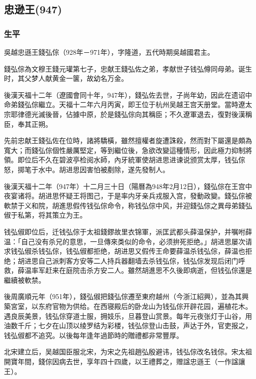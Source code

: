 
\subsection{忠逊王\tiny(947)}

\subsubsection{生平}

吳越忠遜王錢弘倧（928年－971年），字隆道，五代時期吳越國君主。

錢弘倧為文穆王錢元瓘第七子，忠献王錢弘佐之弟，孝献世子钱弘僔同母弟。诞生时，其父梦人献黄金一箧，故幼名万金。

後漢天福十二年（遼國會同十年，947年），錢弘佐去世，子尚年幼，因此在遗诏中命弟錢弘倧繼立。天福十二年六月丙寅，即王位于杭州吴越王宫天册堂。當時遼太宗耶律德光滅後晉，佔據中原，於是錢弘倧向其稱臣；不久遼軍退去，復對後漢稱臣，奉其正朔。

先前忠献王錢弘佐在位時，諸將驕橫，雖然擅權者旋遭誅殺，然而對下屬還是頗為寬大；而錢弘倧個性嚴厲堅定，等到繼位後，急欲改變這種情形，因此極力抑制將領。即位后不久在碧波亭检阅水師，內牙統軍使胡进思进谏说颁赏太厚，钱弘倧怒，掷笔于水中。胡进思因害怕被剷除，遂先發制人。

後漢天福十二年（947年）十二月三十日（陽曆為948年2月12日），錢弘倧在王宫中夜宴诸将。胡进思怀疑王将图己，于是率内牙亲兵戎服入宫，發動政變。錢弘倧被軟禁于义和院，胡進思假传钱弘倧命令，称钱弘倧中风，并迎錢弘倧之異母弟錢弘俶于私第，将其策立为王。

钱弘俶即位后，迁钱弘倧于太祖錢鏐故里衣锦軍，派匡武都头薛温保护，并嘱咐薛温：「自己没有杀兄的意思，一旦傳來类似的命令，必须拚死拒绝。」胡进思屡次请求钱弘俶杀钱弘倧，钱弘俶都拒绝，胡进思又假传王命要薛温杀钱弘倧，薛温也拒绝；胡进思自己派刺客方安等二人持兵器翻墙去杀钱弘倧，钱弘倧发现后闭门呼救，薛温率军赶来在庭院击杀方安二人。雖然胡進思不久後即病逝，但钱弘倧還是繼續被軟禁。

後周廣順元年（951年），錢弘俶把錢弘倧遷至東府越州（今浙江紹興），並為其興築宮室，以东府官物为供给。在西寝殿后的卧龙山为钱弘倧开辟花园，遍植花木。遇良辰美景，钱弘倧穿道士服，拥妓乐，旦暮登山赏景。每年元夜张灯于山谷，用油数千斤；七夕在山顶以绫罗结为彩楼，钱弘倧登山击鼓，声达于外，官吏报之，钱弘俶都不追究。以後每年逢年過節時的贈禮都非常豐厚。

北宋建立后，吴越国臣服北宋，为宋之先祖趙弘殷避讳，钱弘倧改名钱倧。宋太祖開寶年間，錢倧因病去世，享年四十四歲，以王禮葬之，赠諡忠遜王（一作諡讓王）。

